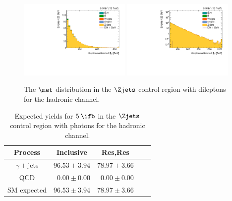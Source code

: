 \begin{figure}[htbp]
  \centering
  \includegraphics[width=0.48\textwidth]{figures/hadronic-incl-2l0b-fmet.pdf}
  \includegraphics[width=0.48\textwidth]{figures/hadronic-incl-2l0b-fmetlog.pdf}
  \caption{The $\met$ distribution in the $\Zjets$ control region with dileptons for the hadronic channel.}
  \label{fig:incl_hadronic_2l0b_fmet}
\end{figure}



\begin{table}[!ht]
\centering
\begin{tabular}{|c|r|r|r|r|}
\hline
  Process &  \multicolumn{1}{|c|}{Inclusive} &\multicolumn{1}{|c|}{Res,Res} \\
\hline
  $\gamma+$jets          & $96.53 \pm 3.94$ &$78.97 \pm 3.66$ \\
  QCD                    & $ 0.00 \pm 0.00$ & $ 0.00 \pm 0.00$ \\
\hline
  SM expected            & $96.53 \pm 3.94$ & $78.97 \pm 3.66$ \\
\hline
\end{tabular}
\caption{Expected yields for $5\:\ifb$ in the $\Zjets$ control region with photons for the hadronic channel.}
\label{tab:hadronic_bkg_pho_yields}
\end{table}



